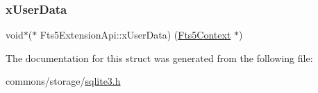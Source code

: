 \subsubsection{\texorpdfstring{xUserData}{xUserData}}
{\footnotesize\ttfamily void$\ast$($\ast$ Fts5\+Extension\+Api\+::x\+User\+Data) (\mbox{\hyperlink{sqlite3_8h_a97821b95ebebd43db901977ffd5b26bc}{Fts5\+Context}} $\ast$)}



The documentation for this struct was generated from the following file\+:\begin{DoxyCompactItemize}
\item 
commons/storage/\mbox{\hyperlink{sqlite3_8h}{sqlite3.\+h}}\end{DoxyCompactItemize}

